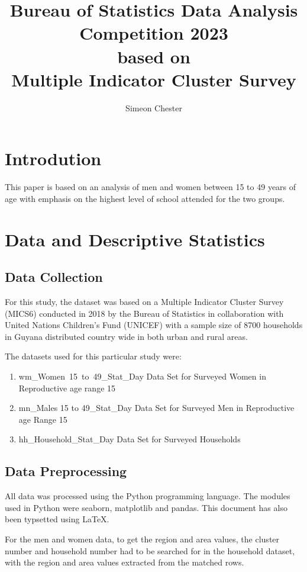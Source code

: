 \documentclass[stu, 12pt, floatsintext,longtable]{apa7}
\author{Simeon Chester}
\title{Bureau of Statistics Data Analysis Competition 2023 \\ based on \\
    Multiple Indicator Cluster Survey}
\begin{document}
\maketitle

\section{Introdution}

This paper is based on an analysis of men and women between 15 to 49 years of
age with emphasis on the highest level of school attended for the two groups.
\section{Data and Descriptive Statistics}
\subsection{Data Collection}

For this study, the dataset was based on a Multiple Indicator Cluster Survey
(MICS6) conducted in 2018 by the Bureau of Statistics in collaboration with
United Nations Children's Fund (UNICEF) with a sample size of 8700 households
in Guyana
distributed country wide in both urban and rural areas.

The datasets used for this particular study were:
\begin{enumerate}
    \item wm\_Women\ 15\ to\ 49\_Stat\_Day \- Data Set for Surveyed Women in
          Reproductive
          age range 15 
    \item mn\_Males 15 to 49\_Stat\_Day \- Data Set for Surveyed Men in
          Reproductive
          age Range 15 
    \item hh\_Household\_Stat\_Day \- Data Set for Surveyed Households
\end{enumerate}
\subsection{Data Preprocessing}
All data was processed using the Python programming language. The modules used
in Python were seaborn, matplotlib and pandas. This document has also been
typsetted using \LaTeX.

For the men and women data, to get the region and area values, the cluster
number and household number had to be searched for
in the household dataset, with the region and area values extracted from
the matched rows.
\end{document}
